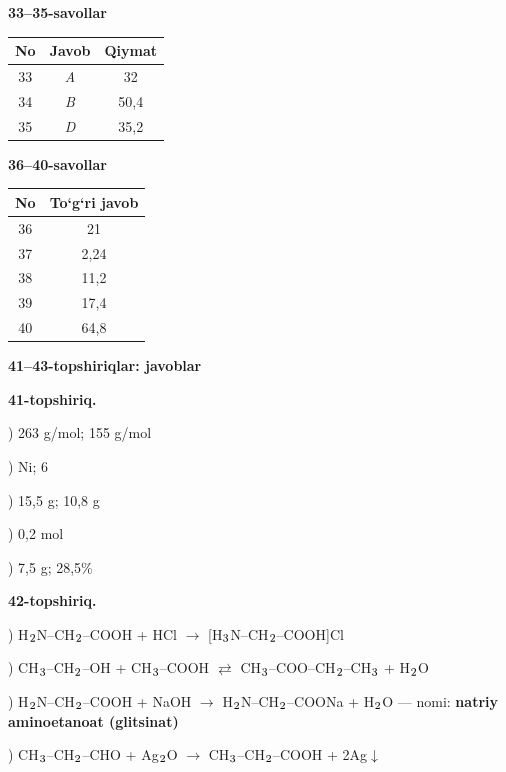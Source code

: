 \documentclass[11pt,a4paper]{article}
\renewcommand{\textsubscript}[1]{\ensuremath{_{\text{\fontsize{8}{8}\selectfont #1}}}}
\begin{document}
\noindent\textbf{33--35-savollar}\par\smallskip
\noindent\begin{tabular}{|c|c|c|}\hline \textbf{No} & \textbf{Javob} & \textbf{Qiymat}\\\hline
33 & \textsl{A} & 32\\\hline
34 & \textsl{B} & 50,4\\\hline
35 & \textsl{D} & 35,2\\\hline
\end{tabular}\par\medskip
\noindent\textbf{36--40-savollar}\par\smallskip
\noindent\begin{tabular}{|c|c|}\hline \textbf{No} & \textbf{To`g`ri javob}\\\hline
36 & 21\\\hline
37 & 2,24\\\hline
38 & 11,2\\\hline
39 & 17,4\\\hline
40 & 64,8\\\hline
\end{tabular}\par\medskip
\noindent\textbf{41--43-topshiriqlar: javoblar}\par\smallskip
\noindent\textbf{41-topshiriq.}\par
{}) 263 g/mol; 155 g/mol\par
{}) Ni; 6\par
{}) 15,5 g; 10,8 g\par
{}) 0,2 mol\par
{}) 7,5 g; 28,5\%\par
\noindent\textbf{42-topshiriq.}\par
{}) H\textsubscript{2}N--CH\textsubscript{2}--COOH + HCl $\to$ [H\textsubscript{3}N--CH\textsubscript{2}--COOH]Cl\par
{}) CH\textsubscript{3}--CH\textsubscript{2}--OH + CH\textsubscript{3}--COOH $\rightleftarrows$ CH\textsubscript{3}--COO--CH\textsubscript{2}--CH\textsubscript{3} + H\textsubscript{2}O\par
{}) H\textsubscript{2}N--CH\textsubscript{2}--COOH + NaOH $\to$ H\textsubscript{2}N--CH\textsubscript{2}--COONa + H\textsubscript{2}O --- nomi: \textbf{natriy aminoetanoat (glitsinat)}\par
{}) CH\textsubscript{3}--CH\textsubscript{2}--CHO + Ag\textsubscript{2}O $\to$ CH\textsubscript{3}--CH\textsubscript{2}--COOH + 2Ag$\downarrow$\par
\end{document}
